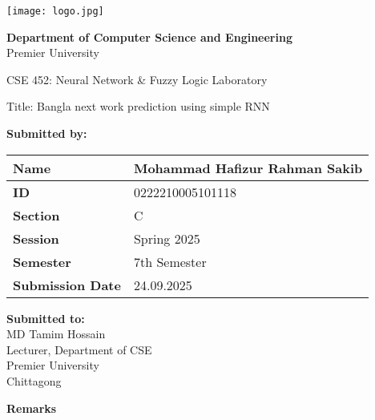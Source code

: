 \documentclass{scrreprt}
\begin{document}
\begin{titlepage}
    \centering
    \texttt{[image: logo.jpg]} %
    \vspace{1cm}

    \textbf{Department of Computer Science and Engineering}\\
    Premier University
    \vspace{1cm}

    \huge \textnormal{CSE 452: Neural Network \& Fuzzy Logic Laboratory}
    \vspace{1in} %

    \Large \textnormal{Title: Bangla next work prediction using simple RNN}
    \vspace{0.5in} %

    \large
    \textbf{Submitted by:}
    \begin{tabular}{|p{}|p{}|} %
        \hline
        \textbf{Name} & Mohammad Hafizur Rahman Sakib\\
        \hline
        \textbf{ID} & 0222210005101118 \\
        \hline
        \textbf{Section} & C \\
        \hline
        \textbf{Session} & Spring 2025 \\
        \hline
        \textbf{Semester} & 7th Semester \\
        \hline
        \textbf{Submission Date} & 24.09.2025 \\
        \hline
    \end{tabular}
    \vspace{1cm}

    \begin{minipage}[t]{0.48\textwidth}
        \textbf{Submitted to:}\\
        MD Tamim Hossain\\
        Lecturer, Department of CSE\\
        Premier University\\
        Chittagong
    \end{minipage}%
    \hfill
    \begin{minipage}[t]{0.48\textwidth}
        \raggedleft
        \textbf{Remarks}\\
        \vspace{0.5cm} %
    \end{minipage}

    \date{\today}
    \vfill
\end{titlepage}
\end{document}
